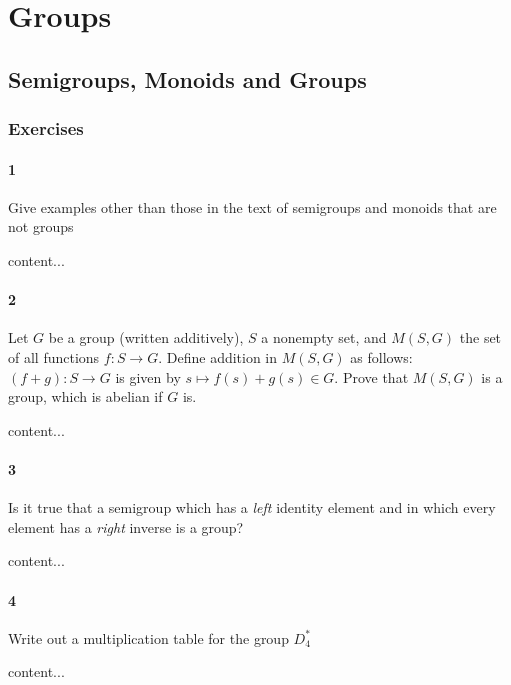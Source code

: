 \chapter{Groups}


\section{Semigroups, Monoids and Groups}

\subsection{Exercises}

\subsubsection*{1}
\begin{graybox}
	Give examples other than those in the text of semigroups and monoids that are not groups
\end{graybox}
\begin{solution}
	content...
\end{solution}

\subsubsection*{2}
\begin{graybox}
	Let $G$ be a group (written additively), $S$ a nonempty set, and $M(S,G)$ the set of all functions $f : S \to G$. Define addition in $M(S,G)$ as follows: $(f + g) : S \to G$ is given by $s \mapsto f(s) + g(s) \in G$. Prove that $M(S,G)$ is a group, which is abelian if $G$ is.
\end{graybox}
\begin{solution}
	content...
\end{solution}

\subsubsection*{3}
\begin{graybox}
	Is it true that a semigroup which has a \textit{left} identity element and in which every element has a \textit{right} inverse is a group?
\end{graybox}
\begin{solution}
	content...
\end{solution}

\subsubsection*{4}
\begin{graybox}
	Write out a multiplication table for the group $D_4^*$
\end{graybox}
\begin{solution}
	content...
\end{solution}

